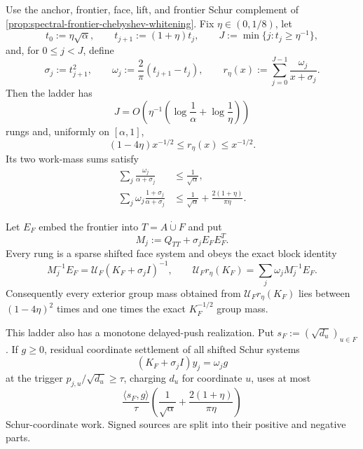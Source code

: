\begin{proposition}
\label{prop:positive-resolvent-rung-ladder}
Use the anchor, frontier, face, lift, and frontier Schur complement of
\cref{prop:spectral-frontier-chebyshev-whitening}.  Fix
$\eta\in(0,1/8)$, let
\begin{equation*}
 t_0:=\eta\sqrt\alpha,
 \qquad t_{j+1}:=(1+\eta)t_j,
 \qquad J:=\min\{j:t_j\geq\eta^{-1}\},
\end{equation*}
and, for $0\leq j<J$, define
\begin{equation}
 \sigma_j:=t_{j+1}^2,
 \qquad
 \omega_j:=\frac2\pi(t_{j+1}-t_j),
 \qquad
 r_\eta(x):=\sum_{j=0}^{J-1}\frac{\omega_j}{x+\sigma_j}.
 \label{eq:positive-rung-rational}
\end{equation}
Then the ladder has
\begin{equation*}
 J=O\!\left(
  \eta^{-1}\left(\log\frac1\alpha+\log\frac1\eta\right)
 \right)
\end{equation*}
rungs and, uniformly on $[\alpha,1]$,
\begin{equation}
 (1-4\eta)x^{-1/2}\leq r_\eta(x)\leq x^{-1/2}.
 \label{eq:positive-rung-sandwich}
\end{equation}
Its two work-mass sums satisfy
\begin{align}
 \sum_j\frac{\omega_j}{\alpha+\sigma_j}
 &\leq\frac1{\sqrt\alpha},
 \label{eq:positive-rung-work-mass}\\
 \sum_j\omega_j\frac{1+\sigma_j}{\alpha+\sigma_j}
 &\leq\frac1{\sqrt\alpha}
  +\frac{2(1+\eta)}{\pi\eta}.
 \label{eq:positive-rung-coordinate-mass}
\end{align}

Let $E_F$ embed the frontier into $T=A\mathbin{\dot\cup}F$ and put
\begin{equation*}
 M_j:=Q_{TT}+\sigma_jE_FE_F^T.
\end{equation*}
Every rung is a sparse shifted face system and obeys the exact block identity
\begin{equation}
 M_j^{-1}E_F
 =\mathcal U_F(K_F+\sigma_jI)^{-1},
 \qquad
 \mathcal U_Fr_\eta(K_F)
 =\sum_j\omega_jM_j^{-1}E_F.
 \label{eq:positive-rung-block-identity}
\end{equation}
Consequently every exterior group mass obtained from
$\mathcal U_Fr_\eta(K_F)$ lies between $(1-4\eta)^2$ times and one times the
exact $K_F^{-1/2}$ group mass.

This ladder also has a monotone delayed-push realization.  Put
$s_F:=(\sqrt{d_u})_{u\in F}$.  If $g\geq0$, residual coordinate settlement of
all shifted Schur systems
\begin{equation*}
 (K_F+\sigma_jI)y_j=\omega_jg
\end{equation*}
at the trigger $p_{j,u}/\sqrt{d_u}\geq\tau$, charging $d_u$ for coordinate
$u$, uses at most
\begin{equation}
 \frac{\langle s_F,g\rangle}{\tau}
 \left(
  \frac1{\sqrt\alpha}+\frac{2(1+\eta)}{\pi\eta}
 \right)
 \label{eq:positive-rung-coordinate-work}
\end{equation}
Schur-coordinate work.  Signed sources are split into their positive and
negative parts.


\end{proposition}
